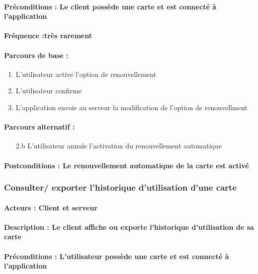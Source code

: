 \documentclass[../annexe.tex]{subfiles}
\begin{document}
\paragraph{Préconditions : Le client possède une carte et est connecté à l'application}
\paragraph{Fréquence :très rarement}
\paragraph{Parcours de base :}
\begin{enumerate}
	\item{L'utilisateur active l'option de renouvellement}
	\item{L'utilisateur confirme}
	\item{L'application envoie au serveur la modification de l'option de renouvellment}
\end{enumerate}
\paragraph{Parcours alternatif :}
\begin{itemize}
	\item[2.b]{L'utilisateur annule l'activation du renouvellement automatique}
\end{itemize}
\paragraph{Postconditions : Le renouvellement automatique de la carte est activé}

\subsubsection{Consulter/ exporter l'historique d'utilisation d'une carte}
\paragraph{Acteurs : Client et serveur}
\paragraph{Description : Le client affiche ou exporte l'historique d'utilisation de sa carte} 
\paragraph{Préconditions : L'utilisateur possède une carte et est connecté à l'application}
\end{document}

